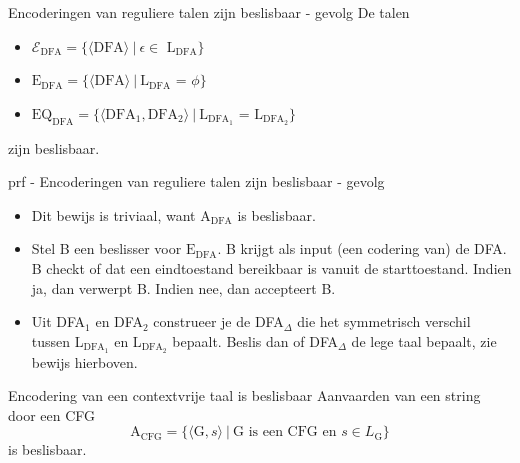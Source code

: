 \begin{lem}{Encoderingen van reguliere talen zijn beslisbaar - gevolg}
    \vspace{-0.1cm}
    De talen
    \begin{itemize}
        \item 
            $\mathcal{E}_{\text{DFA}} = \{\langle \text{DFA} \rangle \ | \ \text{$\epsilon \in$ L$_{\text{DFA}}$} \}$
        \item 
            $\text{E}_{\text{DFA}} = \{\langle \text{DFA} \rangle \ | \ \text{L$_{\text{DFA}}$ = $\phi$} \}$
        \item 
            $\text{EQ}_{\text{DFA}} = \{\langle \text{DFA$_1$}, \text{DFA$_2$} \rangle \ | \ \text{L$_{\text{DFA$_1$}}$ = L$_{\text{DFA$_2$}}$} \}$
    \end{itemize}
    zijn beslisbaar.
    \vspace{-0.1cm}
\end{lem}

\begin{prf}{prf - Encoderingen van reguliere talen zijn beslisbaar - gevolg}
    \begin{itemize}
        \item 
            Dit bewijs is triviaal, want A$_{\text{DFA}}$ is beslisbaar.
        \item 
            Stel B een beslisser voor $\text{E}_{\text{DFA}}$. B krijgt als input (een codering van) de DFA\@. B checkt of dat een eindtoestand bereikbaar is vanuit de starttoestand. Indien ja, dan verwerpt B. Indien nee, dan accepteert B.
        \item 
            Uit DFA$_1$ en DFA$_2$ construeer je de DFA$_{\Delta}$ die het symmetrisch verschil tussen L$_{\text{DFA}_1}$ en L$_{\text{DFA}_2}$ bepaalt. Beslis dan of DFA$_{\Delta}$ de lege taal bepaalt, zie bewijs hierboven.
    \end{itemize}
\end{prf}

\begin{lem}{Encodering van een contextvrije taal is beslisbaar}
    Aanvaarden van een string door een CFG
    \begin{equation*}
        \text{A}_{\text{CFG}} = \{\langle \text{G}, s\rangle\  | \ \text{G is een CFG en $s \in L_{\text{G}}$} \}
    \end{equation*}
    is beslisbaar.
\end{lem}

